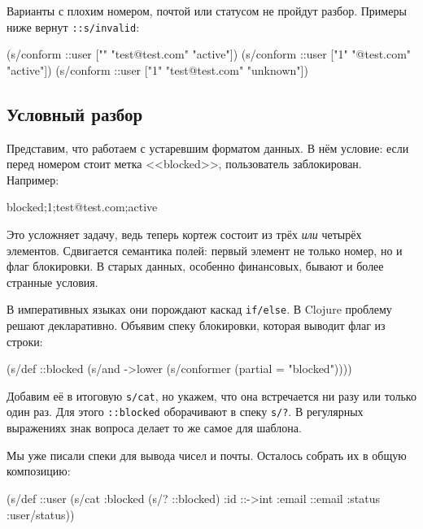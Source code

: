 Варианты с плохим номером, почтой или статусом не пройдут разбор. Примеры ниже
вернут \verb|::s/invalid|:

\begin{english}
  \begin{clojure}
(s/conform ::user ["" "test@test.com" "active"])
(s/conform ::user ["1" "@test.com" "active"])
(s/conform ::user ["1" "test@test.com" "unknown"])
  \end{clojure}
\end{english}

\subsection{Условный разбор}

Представим, что работаем с устаревшим форматом данных. В нём условие: если
перед номером стоит метка <<blocked>>, пользователь заблокирован. Например:

\begin{english}
  \begin{text}
blocked;1;test@test.com;active
  \end{text}
\end{english}

Это усложняет задачу, ведь теперь кортеж состоит из трёх \emph{или} четырёх
элементов. Сдвигается семантика полей: первый элемент не только номер, но и флаг
блокировки. В старых данных, особенно финансовых, бывают и более странные
условия.

В императивных языках они порождают каскад \verb|if/else|. В Clojure проблему
решают декларативно. Объявим спеку блокировки, которая выводит флаг из строки:

\begin{english}
  \begin{clojure}
(s/def ::blocked
  (s/and
   ->lower
   (s/conformer (partial = "blocked"))))
  \end{clojure}
\end{english}


Добавим её в итоговую \verb|s/cat|, но укажем, что она встречается ни разу
или только один раз. Для этого \verb|::blocked| оборачивают в спеку
\verb|s/?|.  В регулярных выражениях знак вопроса делает то же самое для
шаблона.

Мы уже писали спеки для вывода чисел и почты. Осталось собрать их в общую
композицию:

\begin{english}
  \begin{clojure}
(s/def ::user
  (s/cat :blocked (s/? ::blocked)
         :id ::->int
         :email ::email
         :status :user/status))
  \end{clojure}
\end{english}

